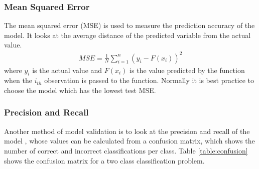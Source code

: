 \documentclass[11pt]{article}
\begin{document}
\subsubsection{Mean Squared Error}
The mean squared error (MSE) is used to measure the prediction accuracy of the model. It looks at the average distance of the predicted variable from the actual value.
\begin{align}
MSE = \frac{1}{N}\sum^{n}_{i = 1} (y_{i}-F(x_{i}))^{2} 
\end{align}
where $y_{i}$ is the actual value and $F(x_{i})$ is the value predicted by the function when the $i_{th}$ observation is passed to the function. Normally it is best practice to choose the model which has the lowest test MSE. \newline
\subsubsection{Precision and Recall}
Another method of model validation is to look at the precision and recall of the model \cite{Patel2015}, whose values can be calculated from a confusion matrix, which shows the number of correct and incorrect classifications per class. Table \ref{table:confusion}  shows the confusion matrix for a two class classification problem.
\begin{table}[h] 
\centering      %
\caption{Confusion Matrix} %
\label{table:confusion} %
\end{table} 
\end{document}
